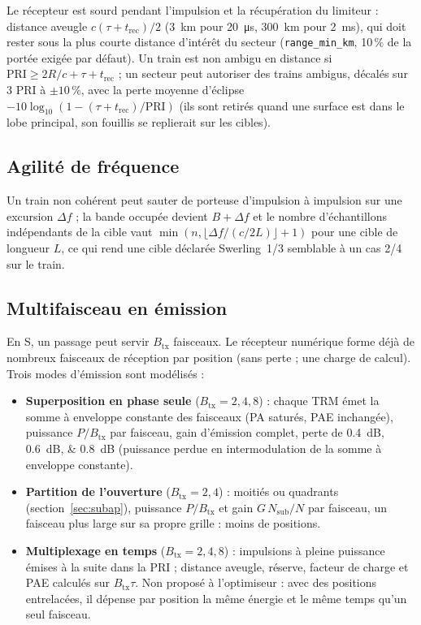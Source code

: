 \documentclass[11pt,a4paper]{article}
\newcommand{\code}[1]{\texttt{\small #1}}
\begin{document}
Le récepteur est sourd pendant l'impulsion et la récupération du limiteur : distance aveugle
$c(\tau + t_{\mathrm{rec}})/2$ (\SI{3}{km} pour \SI{20}{\micro s}, \SI{300}{km} pour \SI{2}{ms}), qui doit rester sous
la plus courte distance d'intérêt du secteur (\code{range\_min\_km}, 10\,\% de la portée exigée par défaut). Un train
est non ambigu en distance si $\mathrm{PRI} \ge 2R/c + \tau + t_{\mathrm{rec}}$ ; un secteur peut autoriser des trains
ambigus, décalés sur 3 PRI à $\pm10\,\%$, avec la perte moyenne d'éclipse $-10\log_{10}(1-(\tau+t_{\mathrm{rec}})/\mathrm{PRI})$
(ils sont retirés quand une surface est dans le lobe principal, son fouillis se replierait sur les cibles).

\subsection{Agilité de fréquence}
Un train non cohérent peut sauter de porteuse d'impulsion à impulsion sur une excursion $\Delta f$ ; la bande occupée
devient $B + \Delta f$ et le nombre d'échantillons indépendants de la cible vaut
$\min(n, \lfloor \Delta f/(c/2L)\rfloor + 1)$ pour une cible de longueur $L$, ce qui rend une cible déclarée Swerling~1/3
semblable à un cas 2/4 sur le train.

\subsection{Multifaisceau en émission}\label{sec:multibeam}
En S, un passage peut servir $B_{\mathrm{tx}}$ faisceaux. Le récepteur numérique forme déjà de nombreux faisceaux de
réception par position (sans perte ; une charge de calcul). Trois modes d'émission sont modélisés :
\begin{itemize}
  \item \textbf{Superposition en phase seule} ($B_{\mathrm{tx}} = 2, 4, 8$) : chaque TRM émet la somme à enveloppe
        constante des faisceaux (PA saturés, PAE inchangée), puissance $P/B_{\mathrm{tx}}$ par faisceau, gain
        d'émission complet, perte de \SIlist{0.4;0.6;0.8}{dB} (puissance perdue en intermodulation de la somme à
        enveloppe constante).
  \item \textbf{Partition de l'ouverture} ($B_{\mathrm{tx}} = 2, 4$) : moitiés ou quadrants (section~\ref{sec:subap}),
        puissance $P/B_{\mathrm{tx}}$ et gain $G\,N_{\mathrm{sub}}/N$ par faisceau, un faisceau plus large sur sa propre
        grille : moins de positions.
  \item \textbf{Multiplexage en temps} ($B_{\mathrm{tx}} = 2, 4, 8$) : impulsions à pleine puissance émises à la suite
        dans la PRI ; distance aveugle, réserve, facteur de charge et PAE calculés sur $B_{\mathrm{tx}}\tau$. Non
        proposé à l'optimiseur : avec des positions entrelacées, il dépense par position la même énergie et le même
        temps qu'un seul faisceau.
\end{itemize}
\end{document}
